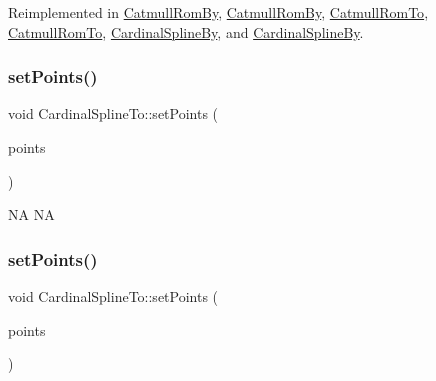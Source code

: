 Reimplemented in \hyperlink{classCatmullRomBy_ab489930d039c543d5965637ed50420d3}{Catmull\+Rom\+By}, \hyperlink{classCatmullRomBy_a2f027f2c6627f98ffcc75a64ff6b0cd0}{Catmull\+Rom\+By}, \hyperlink{classCatmullRomTo_a4657e8372500bbf9faa339cde93d1610}{Catmull\+Rom\+To}, \hyperlink{classCatmullRomTo_ac3a4e10bb0ce746fc0dc76d804482bc3}{Catmull\+Rom\+To}, \hyperlink{classCardinalSplineBy_a565e7afdb1544698e29dda40a201ccae}{Cardinal\+Spline\+By}, and \hyperlink{classCardinalSplineBy_ac5084ddc681589404f2a26d52815344b}{Cardinal\+Spline\+By}.

\mbox{\label{classCardinalSplineTo_a303a067d9052d21a6ffc8004c174001b}} 
\subsubsection{\texorpdfstring{set\+Points()}{setPoints()}\hspace{0.1cm}{\footnotesize\ttfamily [1/2]}}
{\footnotesize\ttfamily void Cardinal\+Spline\+To\+::set\+Points (\begin{DoxyParamCaption}\item[{\hyperlink{classPointArray}{Point\+Array} $\ast$}]{points }\end{DoxyParamCaption})\hspace{0.3cm}{\ttfamily [inline]}}

NA  NA \mbox{\label{classCardinalSplineTo_a303a067d9052d21a6ffc8004c174001b}} 
\subsubsection{\texorpdfstring{set\+Points()}{setPoints()}\hspace{0.1cm}{\footnotesize\ttfamily [2/2]}}
{\footnotesize\ttfamily void Cardinal\+Spline\+To\+::set\+Points (\begin{DoxyParamCaption}\item[{\hyperlink{classPointArray}{Point\+Array} $\ast$}]{points }\end{DoxyParamCaption})\hspace{0.3cm}{\ttfamily [inline]}}

